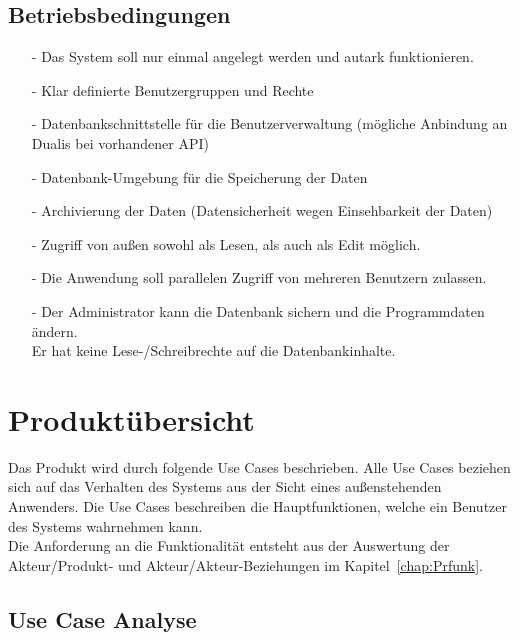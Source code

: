 		\subsection{Betriebsbedingungen}
		\begin{itemize}
		\item[-]	Das System soll nur einmal angelegt werden und autark funktionieren.
		\item[-]	Klar definierte Benutzergruppen und Rechte
		\item[-]	Datenbankschnittstelle für die Benutzerverwaltung (mögliche Anbindung an Dualis bei vorhandener API)
		\item[-]	Datenbank-Umgebung für die Speicherung der Daten
		\item[-]	Archivierung der Daten (Datensicherheit wegen Einsehbarkeit der Daten)
		\item[-]	Zugriff von außen sowohl als Lesen, als auch als Edit möglich. 
		\item[-]	Die Anwendung soll parallelen Zugriff von mehreren Benutzern zulassen.
		\item[-]	Der Administrator kann die Datenbank sichern und die Programmdaten ändern.\\
					Er hat keine Lese-/Schreibrechte auf die Datenbankinhalte.
		\end{itemize}

		
		
	\section{Produktübersicht}
	
	Das Produkt wird durch folgende Use Cases beschrieben. Alle Use Cases beziehen sich auf das Verhalten des Systems aus der Sicht eines außenstehenden Anwenders. Die Use Cases beschreiben die Hauptfunktionen, welche ein Benutzer des Systems wahrnehmen kann.\\
	Die Anforderung an die Funktionalität entsteht aus der Auswertung der Akteur/Produkt- und Akteur/Akteur-Beziehungen im Kapitel~\ref{chap:Prfunk}.
	
	\subsection{Use Case Analyse}
	
